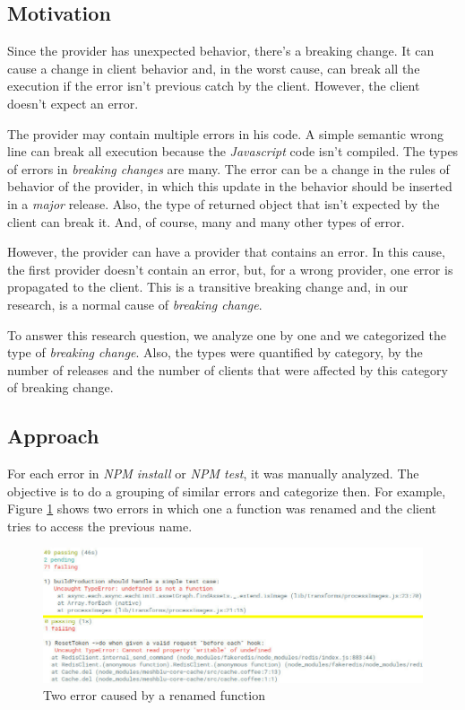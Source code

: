\subsection{Motivation}
\label{mot:rq2}

Since the provider has unexpected behavior, there's a breaking change. It can cause a change in client behavior and, in the worst cause, can break all the execution if the error isn't previous catch by the client. However, the client doesn't expect an error.

The provider may contain multiple errors in his code. A simple semantic wrong line can break all execution because the \textit{Javascript} code isn't compiled. The types of errors in \textit{breaking changes} are many.  The error can be a change in the rules of behavior of the provider, in which this update in the behavior should be inserted in a \textit{major} release. Also, the type of returned object that isn't expected by the client can break it. And, of course, many and many other types of error.

However, the provider can have a provider that contains an error. In this cause, the first provider doesn't contain an error, but, for a wrong provider, one error is propagated to the client. This is a transitive breaking change and, in our research, is a normal cause of \textit{breaking change}.

To answer this research question, we analyze one by one and we categorized the type of \textit{breaking change}. Also, the types were quantified by category, by the number of releases and the number of clients that were affected by this category of breaking change.

\subsection{Approach}
\label{apr:rq2}

For each error in \textit{\Gls{NPM} install} or \textit{\Gls{NPM} test}, it was manually analyzed. The objective is to do a grouping of similar errors and categorize then. For example, Figure \ref{fig:error_category} shows two errors in which one a function was renamed and the client tries to access the previous name.

\begin{figure}[!h]
    \centering
    \includegraphics[scale=0.5]{figuras/error_category.jpeg}
    \caption{Two error caused by a renamed function}
    \label{fig:error_category}
\end{figure}

